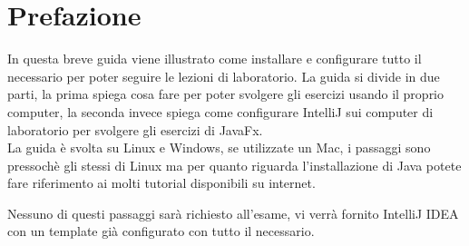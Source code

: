 \chapter*{Prefazione}
    In questa breve guida viene illustrato come installare e configurare tutto il necessario per poter seguire le lezioni di laboratorio.
    La guida si divide in due parti, la prima spiega cosa fare per poter svolgere gli esercizi usando il proprio computer, la seconda invece
    spiega come configurare IntelliJ sui computer di laboratorio per svolgere gli esercizi di JavaFx.\\
    La guida è svolta su Linux e Windows, se utilizzate un Mac, i passaggi sono pressochè gli stessi di Linux ma per quanto riguarda l'installazione
    di Java potete fare riferimento ai molti tutorial disponibili su internet.

    \begin{warningbox}
        Nessuno di questi passaggi sarà richiesto all'esame, vi verrà fornito IntelliJ IDEA con un template già configurato con tutto il necessario.
    \end{warningbox}
